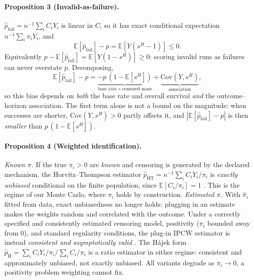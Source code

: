 \documentclass[letterpaper]{article}
\begin{document}
\paragraph{Proposition 3 (Invalid-as-failure).}
$\hat p_{\mathrm{fail}}=n^{-1}\sum_i C_iY_i$ is linear in $C$, so it has exact
conditional expectation $n^{-1}\sum_i \pi_i Y_i$, and
\begin{equation}
\mathbb{E}[\hat p_{\mathrm{fail}}]-p=\mathbb{E}\!\left[Y(s^{H}-1)\right]\le 0 .
\label{eq:fail}
\end{equation}
Equivalently $p-\mathbb{E}[\hat p_{\mathrm{fail}}]=\mathbb{E}[Y(1-s^{H})]\ge0$:
scoring invalid runs as failures can never overstate $p$. Decomposing,
\begin{equation}
\mathbb{E}[\hat p_{\mathrm{fail}}]-p=\underbrace{-p\,(1-\mathbb{E}[s^{H}])}_{\text{base rate}\,\times\,\text{censored mass}}+\underbrace{\mathrm{Cov}(Y,s^{H})}_{\text{association}} ,
\label{eq:faildecomp}
\end{equation}
so this bias depends on \emph{both} the base rate and overall survival
\emph{and} the outcome--horizon association. The first term alone is not a bound
on the magnitude: when successes are shorter, $\mathrm{Cov}(Y,s^{H})>0$ partly
offsets it, and $|\mathbb{E}[\hat p_{\mathrm{fail}}]-p|$ is then \emph{smaller}
than $p\,(1-\mathbb{E}[s^{H}])$.

\paragraph{Proposition 4 (Weighted identification).}
\emph{Known $\pi$.} If the true $\pi_i>0$ are \emph{known} and censoring is
generated by the declared mechanism, the Horvitz--Thompson estimator
$\hat p_{\mathrm{HT}}=n^{-1}\sum_i C_iY_i/\pi_i$ is \emph{exactly unbiased}
conditional on the finite population, since $\mathbb{E}[C_i/\pi_i]=1$
\citep{horvitz1952generalization,robins1994estimation}. This is the regime of
our Monte Carlo, where $\pi_i$ holds by construction.
\emph{Estimated $\pi$.} With $\hat\pi_i$ fitted from data, exact unbiasedness
no longer holds: plugging in an estimate makes the weights random and correlated
with the outcome. Under a correctly specified and consistently estimated
censoring model, positivity ($\pi_i$ bounded away from $0$), and standard
regularity conditions, the plug-in IPCW estimator is instead
\emph{consistent and asymptotically valid}
\citep{robins1994estimation}. The H\'ajek form
$\hat p_{\mathrm{H}}=\sum_i C_iY_i/\pi_i\big/\sum_i C_i/\pi_i$ is a ratio
estimator in either regime: consistent and approximately unbiased, not exactly
unbiased. All variants degrade as $\pi_i\to0$, a positivity problem weighting
cannot fix.
\end{document}
